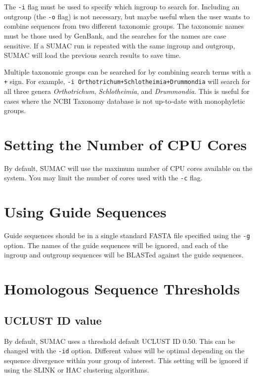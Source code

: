 \documentclass[10pt]{report}
\begin{document}
The \verb|-i| flag must be used to specify which ingroup to search for. 
Including an outgroup (the \texttt{-o} flag) is not necessary, 
but maybe useful when the user wants to combine sequences from two
different taxonomic groups.
The taxonomic names must be those used by GenBank, and the 
searches for the names are case sensitive.
If a SUMAC run is repeated with the same ingroup and outgroup, SUMAC
will load the previous search results to save time.

Multiple taxonomic groups can be searched for by combining
search terms with a \texttt{+} sign. For example,
\texttt{-i Orthotrichum+Schlotheimia+Drummondia} will
search for all three genera \textit{Orthotrichum},
\textit{Schlotheimia}, and \textit{Drummondia}.
This is useful for cases where the NCBI Taxonomy database
is not up-to-date with monophyletic groups.

\section{Setting the Number of CPU Cores}

By default, SUMAC will use the maximum number of CPU cores
available on the system. You may limit the number of cores
used with the \texttt{-c} flag.

\section{Using Guide Sequences}

Guide sequences should be in a single standard FASTA file specified
using the \verb|-g| option. The names of the
guide sequences will be ignored, and each of the ingroup and outgroup 
sequences will be BLASTed against the guide sequences.

\section{Homologous Sequence Thresholds}

\subsection{UCLUST ID value}
By default, SUMAC uses a threshold default UCLUST ID $0.50$.
This can be changed with the \verb|-id| option.
Different values will be optimal depending on the sequence
divergence within your group of interest.
This setting will be ignored if using the SLINK or HAC
clustering algorithms.
\end{document}
